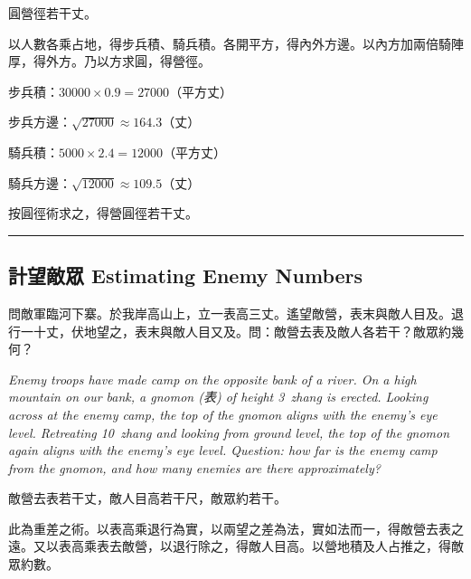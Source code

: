 \documentclass[11pt,a4paper]{article}
\newcommand{\longline}{\noindent\rule{\textwidth}{0.4pt}}
\begin{document}
\begin{answer}
圓營徑若干丈。
\end{answer}

\begin{method}
以人數各乘占地，得步兵積、騎兵積。各開平方，得內外方邊。以內方加兩倍騎陣厚，得外方。乃以方求圓，得營徑。
\end{method}

\begin{working}
步兵積：$30000 \times 0.9 = 27000$（平方丈）

步兵方邊：$\sqrt{27000} \approx 164.3$（丈）

騎兵積：$5000 \times 2.4 = 12000$（平方丈）

騎兵方邊：$\sqrt{12000} \approx 109.5$（丈）

按圓徑術求之，得營圓徑若干丈。
\end{working}

\vspace{0.5em}
\longline

\subsection{計望敵眾 \quad Estimating Enemy Numbers}

\begin{problem}
問敵軍臨河下寨。於我岸高山上，立一表高三丈。遙望敵營，表末與敵人目及。退行一十丈，伏地望之，表末與敵人目又及。問：敵營去表及敵人各若干？敵眾約幾何？

\textit{Enemy troops have made camp on the opposite bank of a river. On a high mountain on our bank, a gnomon (表) of height 3~zhang is erected. Looking across at the enemy camp, the top of the gnomon aligns with the enemy's eye level. Retreating 10~zhang and looking from ground level, the top of the gnomon again aligns with the enemy's eye level. Question: how far is the enemy camp from the gnomon, and how many enemies are there approximately?}
\end{problem}

\begin{answer}
敵營去表若干丈，敵人目高若干尺，敵眾約若干。
\end{answer}

\begin{method}
此為重差之術。以表高乘退行為實，以兩望之差為法，實如法而一，得敵營去表之遠。又以表高乘表去敵營，以退行除之，得敵人目高。以營地積及人占推之，得敵眾約數。
\end{method}

\newpage
\end{document}
